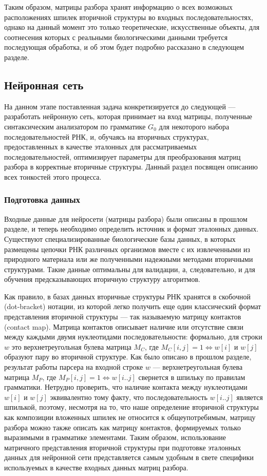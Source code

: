 Таким образом, матрицы разбора хранят информацию о всех возможных расположениях шпилек вторичной структуры во входных последовательностях, однако на данный момент это только теоретические, искусственные объекты, для соотнесения которых с реальными биологическими данными требуется последующая обработка, и об этом будет подробно рассказано в следующем разделе.

\subsection{Нейронная сеть}
На данном этапе поставленная задача конкретизируется до следующей --- разработать нейронную сеть, которая принимает на вход матрицы, полученные синтаксическим анализатором по грамматике $G_0$ для некоторого набора последовательностей РНК, и, обучаясь на вторичных структурах, предоставленных в качестве эталонных для рассматриваемых последовательностей, оптимизирует параметры для преобразования матриц разбора в корректные вторичные структуры. Данный раздел посвящен описанию всех тонкостей этого процесса. 

\subsubsection{Подготовка данных} 
Входные данные для нейросети (матрицы разбора) были описаны в прошлом разделе, и теперь необходимо определить источник и формат эталонных данных. Существуют специализированные биологические базы данных, в которых размещены цепочки РНК различных организмов вместе с их извлеченными из природного материала или же полученными надежными методами вторичными структурами. Такие данные оптимальны для валидации, а, следовательно, и для обучения предсказывающих вторичную структуру алгоритмов. 

Как правило, в базах данных вторичные структуры РНК хранятся в скобочной (dot-bracket) нотации, из которой легко получить еще один классический формат  представления вторичной структуры --- так называемую матрицу контактов (contact map). Матрица контактов описывает наличие или отсутствие связи между каждыми двумя нуклеотидами последовательности: формально, для строки $w$ это верхнетреугольная булева матрица $M_C$, где $M_C[i,j]=1 \iff w[i]$ и $w[j]$ образуют пару во вторичной структуре. Как было описано в прошлом разделе, результат работы парсера на входной строке $w$ --- верхнетреугольная булева матрица $M_P$, где $M_P[i,j]=1 \iff w[i..j]$ свернется в шпильку по правилам грамматики. Нетрудно проверить, что наличие контакта между нуклеотидами $w[i]$ и $w[j]$ эквивалентно тому факту, что последовательность $w[i..j]$ является шпилькой, поэтому, несмотря на то, что наше определение вторичной структуры как композиции вложенных шпилек не относится к общеупотребимым, матрицу разбора можно также описать как матрицу контактов, формируемых только выразимыми в грамматике элементами. Таким образом, использование матричного представления вторичной структуры при подготовке эталонных данных для нейронной сети представляется самым удобным в свете специфики используемых в качестве входных данных матриц разбора. 

